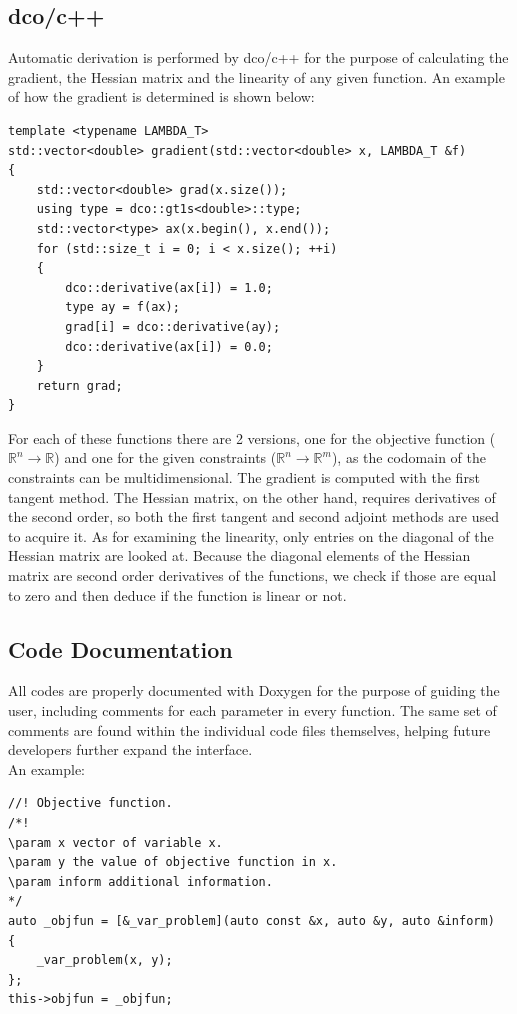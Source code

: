 \documentclass{book}
\begin{document}
\subsection{dco/c++}
Automatic derivation is performed by dco/c++ for the purpose of calculating the gradient, the Hessian matrix and the linearity of any given function. An example of how the gradient is determined is shown below:
\begin{lstlisting}[basicstyle=\normalsize]
template <typename LAMBDA_T>
std::vector<double> gradient(std::vector<double> x, LAMBDA_T &f)
{
	std::vector<double> grad(x.size());
	using type = dco::gt1s<double>::type;
	std::vector<type> ax(x.begin(), x.end());
	for (std::size_t i = 0; i < x.size(); ++i)
	{
		dco::derivative(ax[i]) = 1.0;
		type ay = f(ax);
		grad[i] = dco::derivative(ay);
		dco::derivative(ax[i]) = 0.0;
	}
	return grad;
}
\end{lstlisting}
For each of these functions there are 2 versions, one for the objective function (${\displaystyle \mathbb{R}^n \rightarrow \mathbb{R}}$) and one for the given constraints (${\displaystyle \mathbb{R}^n \rightarrow \mathbb{R}^m}$), as the codomain of the constraints can be multidimensional. The gradient is computed with the first tangent method. The Hessian matrix, on the other hand, requires derivatives of the second order, so both the first tangent and second adjoint methods are used to acquire it. As for examining the linearity, only entries on the diagonal of the Hessian matrix are looked at. Because the diagonal elements of the Hessian matrix are second order derivatives of the functions, we check if those are equal to zero and then deduce if the function is linear or not.

\subsection{Code Documentation}
All codes are properly documented with Doxygen for the purpose of guiding the user, including comments for each parameter in every function. The same set of comments are found within the individual code files themselves, helping future developers further expand the interface. \\
\newline
An example: 
\begin{lstlisting}[basicstyle=\normalsize]
//! Objective function.
/*!
\param x vector of variable x.
\param y the value of objective function in x.
\param inform additional information.
*/
auto _objfun = [&_var_problem](auto const &x, auto &y, auto &inform)
{
	_var_problem(x, y);
};
this->objfun = _objfun;
\end{lstlisting}
\end{document}
